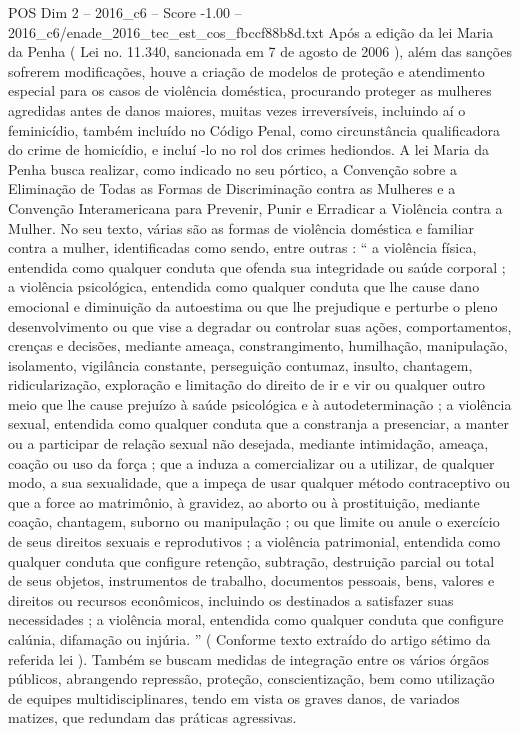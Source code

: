 \begin{textsample}{POS Dim 2 – 2016\_c6 – Score -1.00 – 2016\_c6/enade\_2016\_tec\_est\_cos\_fbccf88b8d.txt}
Após a edição da lei Maria da Penha ( Lei no. 11.340, sancionada em 7 de agosto de 2006 ), além das sanções sofrerem modificações, houve a criação de modelos de proteção e atendimento especial para os casos de violência doméstica, procurando proteger as mulheres agredidas antes de danos maiores, muitas vezes irreversíveis, incluindo aí o feminicídio, também incluído no Código Penal, como circunstância qualificadora do crime de homicídio, e incluí -lo no rol dos crimes hediondos.
A lei Maria da Penha busca realizar, como indicado no seu pórtico, a Convenção sobre a Eliminação de Todas as Formas de Discriminação contra as Mulheres e a Convenção Interamericana para Prevenir, Punir e Erradicar a Violência contra a Mulher.
No seu texto, várias são as formas de violência doméstica e familiar contra a mulher, identificadas como sendo, entre outras : “ a violência física, entendida como qualquer conduta que ofenda sua integridade ou saúde corporal ; a violência psicológica, entendida como qualquer conduta que lhe cause dano emocional e diminuição da autoestima ou que lhe prejudique e perturbe o pleno desenvolvimento ou que vise a degradar ou controlar suas ações, comportamentos, crenças e decisões, mediante ameaça, constrangimento, humilhação, manipulação, isolamento, vigilância constante, perseguição contumaz, insulto, chantagem, ridicularização, exploração e limitação do direito de ir e vir ou qualquer outro meio que lhe cause prejuízo à saúde psicológica e à autodeterminação ; a violência sexual, entendida como qualquer conduta que a constranja a presenciar, a manter ou a participar de relação sexual não desejada, mediante intimidação, ameaça, coação ou uso da força ; que a induza a comercializar ou a utilizar, de qualquer modo, a sua sexualidade, que a impeça de usar qualquer método contraceptivo ou que a force ao matrimônio, à gravidez, ao aborto ou à prostituição, mediante coação, chantagem, suborno ou manipulação ; ou que limite ou anule o exercício de seus direitos sexuais e reprodutivos ; a violência patrimonial, entendida como qualquer conduta que configure retenção, subtração, destruição parcial ou total de seus objetos, instrumentos de trabalho, documentos pessoais, bens, valores e direitos ou recursos econômicos, incluindo os destinados a satisfazer suas necessidades ; a violência moral, entendida como qualquer conduta que configure calúnia, difamação ou injúria. ” ( Conforme texto extraído do artigo sétimo da referida lei ).
Também se buscam medidas de integração entre os vários órgãos públicos, abrangendo repressão, proteção, conscientização, bem como utilização de equipes multidisciplinares, tendo em vista os graves danos, de variados matizes, que redundam das práticas agressivas.

\end{textsample}
